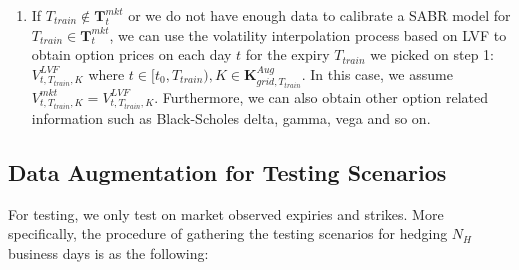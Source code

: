 \documentclass[letterpaper,12pt,titlepage,oneside,final]{book}
\numberwithin{equation}{section}
\theoremstyle{definition}
\newcommand{\Vmkt}{V^{mkt}}
\begin{document}
\begin{enumerate}
	
	\item If $T_{train} \notin \mathbf{T}_t^{mkt}$ or we do not have enough data to calibrate a SABR model for $T_{train} \in  \mathbf{T}_t^{mkt}$, we can use the  volatility interpolation process based on LVF \cite{andreasen2010volatility} to obtain option prices on each day $t$ for the expiry $T_{train}$ we picked on step 1: $V^{LVF}_{t,T_{train},K}$ where $t \in [t_0, T_{train}), K \in \mathbf{K}^{Aug}_{grid,T_{train}}$.  In this case, we assume  $\Vmkt_{t,T_{train},K}=V^{LVF}_{t,T_{train},K}$. Furthermore, we can also obtain other option related information such as Black-Scholes delta, gamma, vega and so on.

%	
\end{enumerate}
\subsection{Data Augmentation for Testing Scenarios}
For testing, we only test on  market observed expiries and strikes. More specifically, the procedure of gathering the testing scenarios for hedging $N_H$ business days is as the following:
\end{document}
